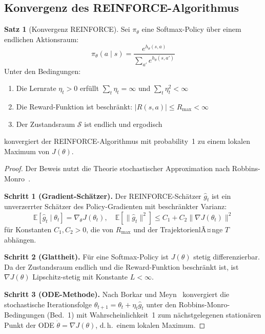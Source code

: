 ﻿\documentclass[a4paper,12pt]{article}
\theoremstyle{definition}
\newtheorem{satz}{Satz}
\begin{document}
\subsection{Konvergenz des REINFORCE-Algorithmus}

\begin{satz}[Konvergenz REINFORCE]
\label{satz:konvergenz}
  Sei $\pi_\theta$ eine Softmax-Policy \"uber einem endlichen Aktionsraum:
  \[
    \pi_\theta(a \mid s) = \frac{e^{h_\theta(s,a)}}{\sum_{a'} e^{h_\theta(s,a')}}
  \]
  Unter den Bedingungen:
  \begin{enumerate}
    \item Die Lernrate $\eta_t > 0$ erf\"ullt $\sum_t \eta_t = \infty$ und $\sum_t \eta_t^2 < \infty$
    \item Die Reward-Funktion ist beschr\"ankt: $|R(s,a)| \leq R_{\max} < \infty$
    \item Der Zustandsraum $\mathcal{S}$ ist endlich und ergodisch
  \end{enumerate}
  konvergiert der REINFORCE-Algorithmus mit probability~1 zu einem lokalen Maximum von $J(\theta)$.
\end{satz}

\begin{proof}
  Der Beweis nutzt die Theorie stochastischer Approximation nach Robbins-Monro~\cite{robbins1951}.
  
  \textbf{Schritt 1 (Gradient-Sch\"atzer).} Der REINFORCE-Sch\"atzer $\hat{g}_t$ ist ein unverzerrter
  Sch\"atzer des Policy-Gradienten mit beschr\"ankter Varianz:
  \[
    \mathbb{E}[\hat{g}_t \mid \theta_t] = \nabla_\theta J(\theta_t), \quad
    \mathbb{E}[\|\hat{g}_t\|^2] \leq C_1 + C_2 \|\nabla J(\theta_t)\|^2
  \]
  f\"ur Konstanten $C_1, C_2 > 0$, die von $R_{\max}$ und der TrajektorienlÃ¤nge $T$ abh\"angen.
  
  \textbf{Schritt 2 (Glattheit).} F\"ur eine Softmax-Policy ist $J(\theta)$ stetig differenzierbar.
  Da der Zustandsraum endlich und die Reward-Funktion beschr\"ankt ist, ist $\nabla J(\theta)$
  Lipschitz-stetig mit Konstante $L < \infty$.
  
  \textbf{Schritt 3 (ODE-Methode).} Nach Borkar und Meyn~\cite{borkar2000} konvergiert die
  stochastische Iterationsfolge $\theta_{t+1} = \theta_t + \eta_t \hat{g}_t$ unter den
  Robbins-Monro-Bedingungen (Bed.~1) mit Wahrscheinlichkeit~1 zum n\"achstgelegenen
  station\"aren Punkt der ODE $\dot{\theta} = \nabla J(\theta)$, d.\,h.\ einem lokalen Maximum.
\end{proof}
\end{document}
